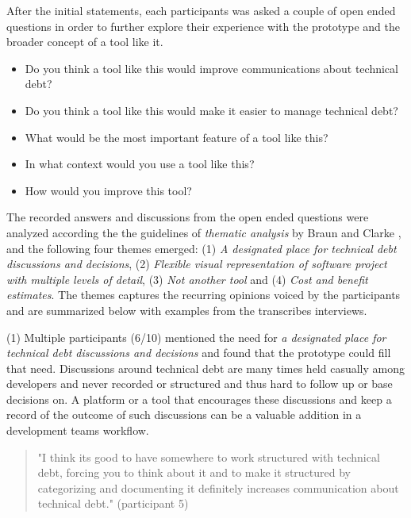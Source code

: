 After the initial statements, each participants was asked a couple of open ended questions in order to further explore their experience with the prototype and the broader concept of a tool like it.

\smallskip
\begin{itemize}
  \item Do you think a tool like this would improve communications about technical debt?
  \item Do you think a tool like this would make it easier to manage technical debt?
  \item What would be the most important feature of a tool like this?
  \item In what context would you use a tool like this?
  \item How would you improve this tool?
\end{itemize}
\smallskip

The recorded answers and discussions from the open ended questions were analyzed according the the guidelines of \textit{thematic analysis} by Braun and Clarke \cite{braun_using_2006}, and the following four themes emerged:
(1) \textit{A designated place for technical debt discussions and decisions}, (2) \textit{Flexible visual representation of software project with multiple levels of detail}, (3) \textit{Not another tool} and (4) \textit{Cost and benefit estimates}.
The themes captures the recurring opinions voiced by the participants and are summarized below with examples from the transcribes interviews.

(1) Multiple participants (6/10) mentioned the need for \textit{a designated place for technical debt discussions and decisions} and found that the prototype could fill that need.
Discussions around technical debt are many times held casually among developers and never recorded or structured and thus hard to follow up or base decisions on.
A platform or a tool that encourages these discussions and keep a record of the outcome of such discussions can be a valuable addition in a development teams workflow. 
\begin{quote}
  "I think its good to have somewhere to work structured with technical debt, forcing you to think about it and to make it structured by categorizing and documenting it definitely increases communication about technical debt." (participant 5)
\end{quote}

